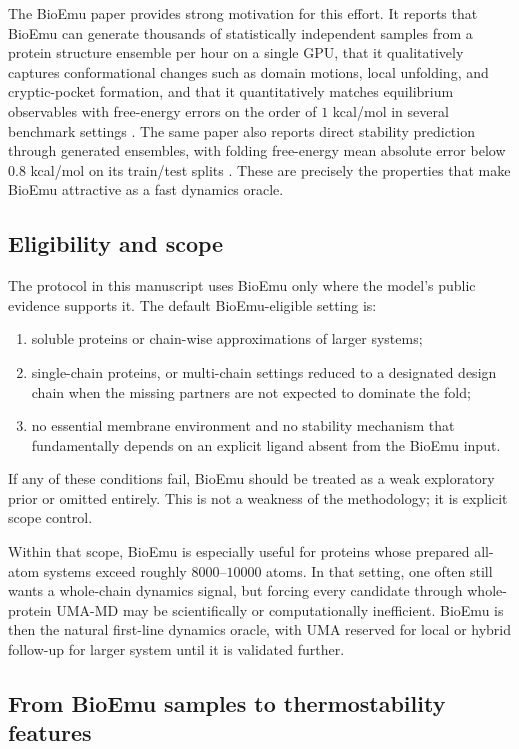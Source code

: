 \documentclass[11pt]{article}
\begin{document}
The BioEmu paper provides strong motivation for this effort. It reports that BioEmu can generate thousands of statistically independent samples from a protein structure ensemble per hour on a single GPU, that it qualitatively captures conformational changes such as domain motions, local unfolding, and cryptic-pocket formation, and that it quantitatively matches equilibrium observables with free-energy errors on the order of $1$ kcal/mol in several benchmark settings \citep{lewis2024bioemu}. The same paper also reports direct stability prediction through generated ensembles, with folding free-energy mean absolute error below $0.8$ kcal/mol on its train/test splits \citep{lewis2024bioemu}. These are precisely the properties that make BioEmu attractive as a fast dynamics oracle.

\subsection{Eligibility and scope}

The protocol in this manuscript uses BioEmu only where the model's public evidence supports it. The default BioEmu-eligible setting is:
\begin{enumerate}[leftmargin=1.5em]
    \item soluble proteins or chain-wise approximations of larger systems;
    \item single-chain proteins, or multi-chain settings reduced to a designated design chain when the missing partners are not expected to dominate the fold;
    \item no essential membrane environment and no stability mechanism that fundamentally depends on an explicit ligand absent from the BioEmu input.
\end{enumerate}
If any of these conditions fail, BioEmu should be treated as a weak exploratory prior or omitted entirely. This is not a weakness of the methodology; it is explicit scope control.

Within that scope, BioEmu is especially useful for proteins whose prepared all-atom systems exceed roughly $8000$--$10000$ atoms. In that setting, one often still wants a whole-chain dynamics signal, but forcing every candidate through whole-protein UMA-MD may be scientifically or computationally inefficient. BioEmu is then the natural first-line dynamics oracle, with UMA reserved for local or hybrid follow-up for larger system until it is validated further.

\subsection{From BioEmu samples to thermostability features}
\end{document}

